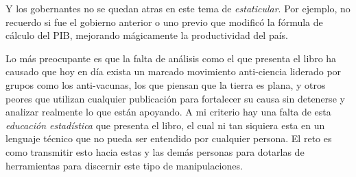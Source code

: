 \documentclass[letterpaper, 11pt]{article}
\begin{document}
Y los gobernantes no se quedan atras en este tema de \textit{estaticular}. Por ejemplo, no recuerdo si fue el gobierno anterior o uno previo que modificó la fórmula de cálculo del PIB, mejorando mágicamente la productividad del país.

Lo más preocupante es que la falta de análisis como el que presenta el libro ha causado que hoy en día exista un marcado movimiento anti-ciencia liderado por grupos como los anti-vacunas, los que piensan que la tierra es plana, y otros peores que utilizan cualquier publicación para fortalecer su causa sin detenerse y analizar realmente lo que están apoyando. A mi criterio hay una falta de esta \textit{educación estadística} que presenta el libro, el cual ni tan siquiera esta en un lenguaje técnico que no pueda ser entendido por cualquier persona. El reto es como transmitir esto hacia estas y las demás personas para dotarlas de herramientas para discernir este tipo de manipulaciones.
\end{document}
